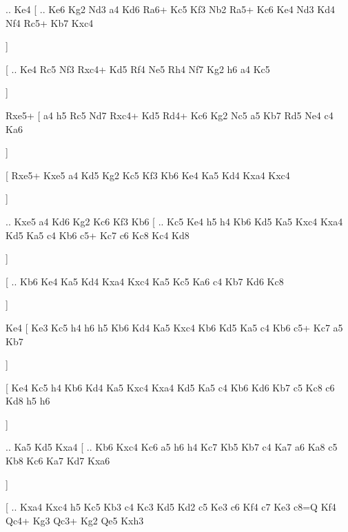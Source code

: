                    .. Ke4 [ .. Ke6  Kg2 Nd3  a4 Kd6  Ra6+ Kc5  Kf3 Nb2  Ra5+ Kc6  Ke4 Nd3  Kd4 Nf4  Rc5+ Kb7  Kxc4   
                   
                   \dummy  \showboard  ]  
                   
                   [ .. Ke4  Rc5 Nf3  Rxc4+ Kd5  Rf4 Ne5  Rh4 Nf7  Kg2 h6  a4 Kc5   
                   
                   \dummy  \showboard  ] 
                   
                    Rxe5+ [  a4 h5  Rc5 Nd7  Rxc4+ Kd5  Rd4+ Kc6  Kg2 Nc5  a5 Kb7  Rd5 Ne4  c4 Ka6   
                   
                   \dummy  \showboard  ] 
                   
                    [  Rxe5+ Kxe5  a4 Kd5  Kg2 Kc5  Kf3 Kb6  Ke4 Ka5  Kd4 Kxa4  Kxc4  
                    
                     \dummy  \showboard  ] 
                     
                     .. Kxe5    a4   Kd6    Kg2   Kc6    Kf3   Kb6 [ .. Kc5  Ke4 h5  h4 Kb6  Kd5 Ka5  Kxc4 Kxa4  Kd5 Ka5  c4 Kb6  c5+ Kc7  c6 Kc8  Kc4 Kd8   
                     
                     \dummy  \showboard  ]  
                     
                     [ .. Kb6  Ke4 Ka5  Kd4 Kxa4  Kxc4 Ka5  Kc5 Ka6  c4 Kb7  Kd6 Kc8   
                     
                     \dummy  \showboard  ]  
                     
                     Ke4 [  Ke3 Kc5  h4 h6  h5 Kb6  Kd4 Ka5  Kxc4 Kb6  Kd5 Ka5  c4 Kb6  c5+ Kc7  a5 Kb7   
                     
                     \dummy  \showboard  ] 
                     
                      [  Ke4 Kc5  h4 Kb6  Kd4 Ka5  Kxc4 Kxa4  Kd5 Ka5  c4 Kb6  Kd6 Kb7  c5 Kc8  c6 Kd8  h5 h6   
                      
                      \dummy  \showboard  ] 
                      
                      .. Ka5    Kd5   Kxa4 [ .. Kb6  Kxc4 Kc6  a5 h6  h4 Kc7  Kb5 Kb7  c4 Ka7  a6 Ka8  c5 Kb8  Kc6 Ka7  Kd7 Kxa6   
                      
                      \dummy  \showboard  ]  
                      
                      [ .. Kxa4  Kxc4 h5  Kc5 Kb3  c4 Kc3  Kd5 Kd2  c5 Ke3  c6 Kf4  c7 Ke3  c8=Q Kf4  Qc4+ Kg3  Qc3+ Kg2  Qe5 Kxh3   
                      
